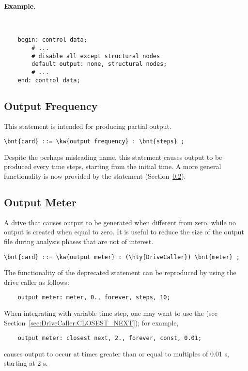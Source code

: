 \paragraph{Example.} \
\begin{verbatim}
    begin: control data;
        # ...
        # disable all except structural nodes
        default output: none, structural nodes;
        # ...
    end: control data;
\end{verbatim}

\subsection{Output Frequency}
\label{sec:CONTROLDATA:OUTPUTFREQUENCY}
This statement is intended for producing partial output.
\begin{Verbatim}[commandchars=\\\{\}]
    \bnt{card} ::= \kw{output frequency} : \bnt{steps} ;
\end{Verbatim}
Despite the perhaps misleading name, this statement causes output to be produced
every \nt{steps} time steps, starting from the initial time.
A more general functionality is now provided by the 
statement (Section~\ref{sec:CONTROLDATA:OUTPUTMETER}).

\subsection{Output Meter}
\label{sec:CONTROLDATA:OUTPUTMETER}
A drive that causes output to be generated when different from zero,
while no output is created when equal to zero.  It is useful to reduce 
the size of the output file during analysis phases that are not of interest.
\begin{Verbatim}[commandchars=\\\{\}]
    \bnt{card} ::= \kw{output meter} : (\hty{DriveCaller}) \bnt{meter} ;
\end{Verbatim}
The functionality of the deprecated  statement
can be reproduced by using the \nt{meter} drive caller as follows:
\begin{verbatim}
    output meter: meter, 0., forever, steps, 10;
\end{verbatim}

When integrating with variable time step,
one may want to use the
 
(see Section~\ref{sec:DriveCaller:CLOSEST_NEXT}); for example,
\begin{verbatim}
    output meter: closest next, 2., forever, const, 0.01;
\end{verbatim}
causes output to occur at times greater than or equal to
multiples of 0.01 s, starting at 2 s.

